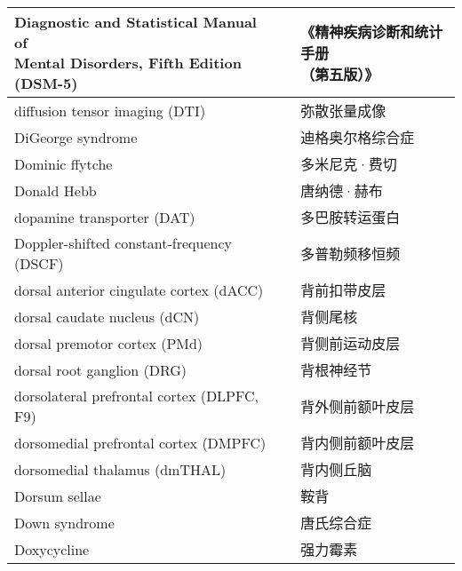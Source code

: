 \begin{longtable}{lll}
	\midrule
	\makecell{Diagnostic and Statistical Manual of \\Mental Disorders, Fifth Edition (DSM-5)}     &&  \makecell{《精神疾病诊断和统计手册\\（第五版）》}  \\
	
	\midrule
	diffusion tensor imaging (DTI)    &&  弥散张量成像  \\
	
	\midrule
	DiGeorge syndrome    &&  迪格奥尔格综合症  \\
	
	\midrule
	Dominic ffytche    &&  多米尼克·费切  \\
	
	\midrule
	Donald Hebb    &&  唐纳德·赫布  \\
	
	\midrule
	dopamine transporter (DAT)     &&  多巴胺转运蛋白  \\
	
	\midrule
	Doppler-shifted constant-frequency (DSCF)     &&  多普勒频移恒频  \\
	
	\midrule
	dorsal anterior cingulate cortex (dACC)     &&  背前扣带皮层  \\
	
	\midrule
	dorsal caudate nucleus (dCN)     &&  背侧尾核  \\
	
	\midrule
	dorsal premotor cortex (PMd)     &&  背侧前运动皮层  \\
	
	\midrule
	dorsal root ganglion (DRG)     &&  背根神经节  \\
	
	\midrule
	dorsolateral prefrontal cortex (DLPFC, F9)     &&  背外侧前额叶皮层  \\
	
	\midrule
	dorsomedial prefrontal cortex (DMPFC)     &&  背内侧前额叶皮层  \\
	
	\midrule
	dorsomedial thalamus (dmTHAL)     &&  背内侧丘脑  \\
	
	\midrule
	Dorsum sellae     &&  鞍背  \\
	
	\midrule
	Down syndrome     &&  唐氏综合症  \\
	
	\midrule
	Doxycycline     &&  强力霉素  \\
	

\end{longtable}
